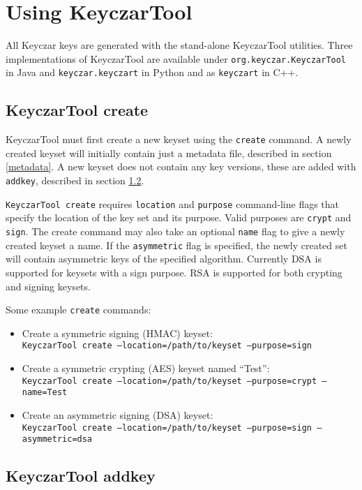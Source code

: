 \documentclass{llncs}
\begin{document}
\section{Using KeyczarTool}\label{keytool}

All Keyczar keys are generated with the stand-alone KeyczarTool
utilities. Three implementations of KeyczarTool are available under
{\tt org.keyczar.KeyczarTool} in Java and {\tt keyczar.keyczart} in
Python and as {\tt keyczart} in C++.

\subsection{KeyczarTool create}
KeyczarTool must first create a new keyset using the {\tt create}
command. A newly created keyset will initially contain just a metadata
file, described in section \ref{metadata}.  A new keyset does not
contain any key versions, these are added with {\tt addkey}, described
in section \ref{addkey}.

{\tt KeyczarTool create} requires {\tt location} and {\tt purpose}
command-line flags that specify the location of the key set and its
purpose. Valid purposes are {\tt crypt} and {\tt sign}. The create
command may also take an optional {\tt name} flag to give a newly
created keyset a name. If the {\tt asymmetric} flag is specified, the
newly created set will contain asymmetric keys of the specified
algorithm. Currently DSA is supported for keysets with a sign
purpose. RSA is supported for both crypting and signing keysets.

Some example {\tt create} commands:
\begin{itemize}
\item Create a symmetric signing (HMAC) keyset: \\
{\tt KeyczarTool create --location=/path/to/keyset --purpose=sign}
\item Create a symmetric crypting (AES) keyset named ``Test'': \\
{\tt KeyczarTool create --location=/path/to/keyset --purpose=crypt --name=Test}
\item Create an asymmetric signing (DSA) keyset: \\
{\tt KeyczarTool create --location=/path/to/keyset --purpose=sign
--asymmetric=dsa}
\end{itemize}

\subsection{KeyczarTool addkey}\label{addkey}
\end{document}
